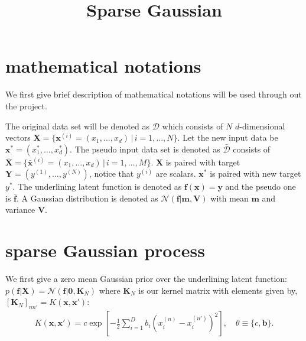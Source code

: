 \documentclass[10pt,a4paper]{article}
\title{Sparse Gaussian}
\begin{document}
\maketitle
\section{mathematical notations}
We first give brief description of mathematical notations will be used through out the project. 

The original data set will be denoted as $\mathcal{D}$ which consists of $N$ $d$-dimensional vectors $\mathbf{X}=\lbrace\mathbf{x}^{(i)}=(x_1,\dots,x_d)\,|\, i=1,\dots,N\rbrace$. Let the new input data be $\mathbf{x}^{*}=(x^*_1,\dots,x^*_d)$. The pseudo input data set is denoted as $\bar{\mathcal{D}}$ consists of $\bar{\mathbf{X}}=\lbrace\mathbf{\bar{x}}^{(i)}=(x_1,\dots,x_d)\,|\,i=1,\dots,M\rbrace$. $\mathbf{X}$ is paired with target $\mathbf{Y}=(y^{(1)},\dots,y^{(N)})$, notice that $y^{(i)}$ are scalars. $\mathbf{x}^*$ is paired with new target $y^*$. The underlining latent function is denoted as $\mathbf{f}(\mathbf{x})=\mathbf{y}$ and the pseudo one is $\bar{\mathbf{f}}$. A Gaussian distribution is denoted as $\mathcal{N}(\mathbf{f}|\mathbf{m},\mathbf{V})$ with mean $\mathbf{m}$ and variance $\mathbf{V}$.
\section{sparse Gaussian process}
We first give a zero mean Gaussian prior over the underlining latent function: $p(\mathbf{f}|\mathbf{X})=\mathcal{N}(\mathbf{f}|\mathbf{0},\mathbf{K}_N)$ where $\mathbf{K}_N$ is our kernel matrix with elements given by, $[\mathbf{K}_N]_{nn'}=K(\mathbf{x},\mathbf{x}')$:
\begin{align}
K(\mathbf{x},\mathbf{x}')=c\exp [-\frac{1}{2}\sum_{i=1}^{D}b_i(x^{(n)}_i-x^{(n')}_i)^2], \quad\theta\equiv \lbrace c,\mathbf{b}\rbrace.
\end{align}
\end{document}
